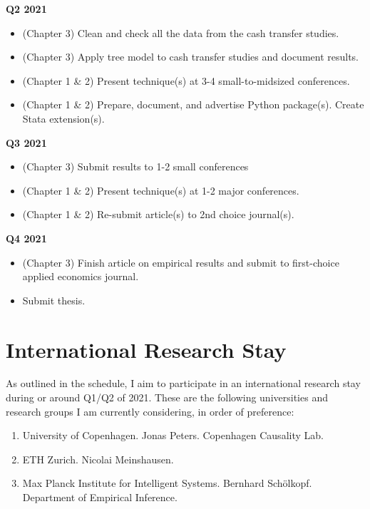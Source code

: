 \documentclass[a4paper,12pt]{article}
\begin{document}
\textbf{Q2 2021}

\begin{itemize}
\item (Chapter 3) Clean and check all the data from the cash transfer studies.
\item (Chapter 3) Apply tree model to cash transfer studies and document results.
\item (Chapter 1 \& 2) Present technique(s) at 3-4 small-to-midsized conferences.
\item (Chapter 1 \& 2) Prepare, document, and advertise Python package(s). Create Stata extension(s).
\end{itemize}

\textbf{Q3 2021}

\begin{itemize}
\item (Chapter 3) Submit results to 1-2 small conferences
\item (Chapter 1 \& 2) Present technique(s) at 1-2 major conferences.
\item (Chapter 1 \& 2) Re-submit article(s) to 2nd choice journal(s).
\end{itemize}

\textbf{Q4 2021}

\begin{itemize}
\item (Chapter 3) Finish article on empirical results and submit to first-choice applied economics journal.
\item Submit thesis.
\end{itemize}


\section{International Research Stay}

As outlined in the schedule, I aim to participate in an international research stay during or around Q1/Q2 of 2021. These are the following universities and research groups I am currently considering, in order of preference: 

\begin{enumerate}
\item University of Copenhagen. Jonas Peters. Copenhagen Causality Lab.
\item ETH Zurich. Nicolai Meinshausen.
\item Max Planck Institute for Intelligent Systems. Bernhard Schölkopf. Department of Empirical Inference.
\end{enumerate}
\end{document}
